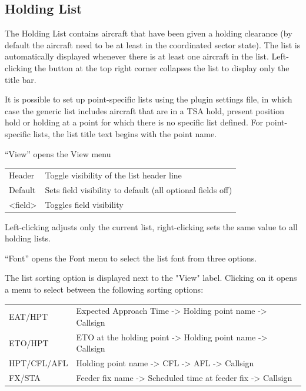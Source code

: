 \documentclass[a4paper,oneside,11pt]{memoir}
\begin{document}
\subsection{Holding List}\label{list:hold}


The Holding List contains aircraft that have been given a holding clearance (by default the aircraft need to be at least in the coordinated sector state). The list is automatically displayed whenever there is at least one aircraft in the list. Left-clicking the button at the top right corner collapses the list to display only the title bar.

\bigskip

It is possible to set up point-specific lists using the plugin settings file, in which case the generic list includes aircraft that are in a TSA hold, present position hold or holding at a point for which there is no specific list defined. For point-specific lists, the list title text begins with the point name.

\bigskip

“View” opens the View menu

\begin{longtable}{p{5cm} p{7.5cm}}
  Header  & Toggle visibility of the list header line\\
  Default & Sets field visibility to default (all optional fields off)\\
  <field> & Toggles field visibility\\
\end{longtable}

Left-clicking adjusts only the current list, right-clicking sets the same value to all holding lists.

\bigskip

“Font” opens the Font menu to select the list font from three options.

\bigskip

The list sorting option is displayed next to the "View" label. Clicking on it opens a menu to select between the following sorting options:

\bigskip

\begin{longtable}{p{5cm} p{7.5cm}}
  EAT/HPT     & Expected Approach Time -> Holding point name -> Callsign\\
  ETO/HPT     & ETO at the holding point -> Holding point name -> Callsign\\
  HPT/CFL/AFL & Holding point name -> CFL -> AFL -> Callsign\\
  FX/STA      & Feeder fix name -> Scheduled time at feeder fix -> Callsign\\
\end{longtable}
\end{document}
